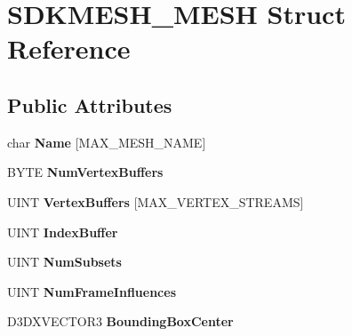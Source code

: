 \hypertarget{struct_s_d_k_m_e_s_h___m_e_s_h}{\section{S\+D\+K\+M\+E\+S\+H\+\_\+\+M\+E\+S\+H Struct Reference}
\label{struct_s_d_k_m_e_s_h___m_e_s_h}
}
\subsection*{Public Attributes}
\begin{DoxyCompactItemize}
\item 
\hypertarget{struct_s_d_k_m_e_s_h___m_e_s_h_ad4e1eadc57a791c23b203c04b9a00242}{char {\bfseries Name} \mbox{[}M\+A\+X\+\_\+\+M\+E\+S\+H\+\_\+\+N\+A\+M\+E\mbox{]}}\label{struct_s_d_k_m_e_s_h___m_e_s_h_ad4e1eadc57a791c23b203c04b9a00242}

\item 
\hypertarget{struct_s_d_k_m_e_s_h___m_e_s_h_af85db6d15b063c73bee3bf87989c8430}{B\+Y\+T\+E {\bfseries Num\+Vertex\+Buffers}}\label{struct_s_d_k_m_e_s_h___m_e_s_h_af85db6d15b063c73bee3bf87989c8430}

\item 
\hypertarget{struct_s_d_k_m_e_s_h___m_e_s_h_a39c21036443f868f9f51356b133773fa}{U\+I\+N\+T {\bfseries Vertex\+Buffers} \mbox{[}M\+A\+X\+\_\+\+V\+E\+R\+T\+E\+X\+\_\+\+S\+T\+R\+E\+A\+M\+S\mbox{]}}\label{struct_s_d_k_m_e_s_h___m_e_s_h_a39c21036443f868f9f51356b133773fa}

\item 
\hypertarget{struct_s_d_k_m_e_s_h___m_e_s_h_acd914d639e1f3dc1ad44f6d4d04b4e30}{U\+I\+N\+T {\bfseries Index\+Buffer}}\label{struct_s_d_k_m_e_s_h___m_e_s_h_acd914d639e1f3dc1ad44f6d4d04b4e30}

\item 
\hypertarget{struct_s_d_k_m_e_s_h___m_e_s_h_a5d64542973cbd54ec6530b2bea8a3774}{U\+I\+N\+T {\bfseries Num\+Subsets}}\label{struct_s_d_k_m_e_s_h___m_e_s_h_a5d64542973cbd54ec6530b2bea8a3774}

\item 
\hypertarget{struct_s_d_k_m_e_s_h___m_e_s_h_ae26a67171373f83dc9a210e7da9e0d20}{U\+I\+N\+T {\bfseries Num\+Frame\+Influences}}\label{struct_s_d_k_m_e_s_h___m_e_s_h_ae26a67171373f83dc9a210e7da9e0d20}

\item 
\hypertarget{struct_s_d_k_m_e_s_h___m_e_s_h_af347f36b54fe785b34e5e0bb8a51cbd8}{D3\+D\+X\+V\+E\+C\+T\+O\+R3 {\bfseries Bounding\+Box\+Center}}\label{struct_s_d_k_m_e_s_h___m_e_s_h_af347f36b54fe785b34e5e0bb8a51cbd8}


\end{DoxyCompactItemize}
